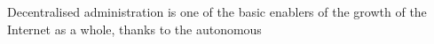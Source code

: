 Decentralised administration is one of the basic enablers of the growth of the Internet as a whole, thanks to the autonomous 